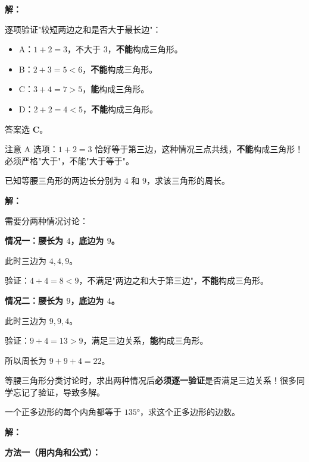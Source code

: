 \documentclass[12pt, a4paper]{ctexart}
\begin{document}
\textbf{解：}

逐项验证"较短两边之和是否大于最长边"：

\begin{itemize}[nosep]
  \item A：$1 + 2 = 3$，不大于 $3$，\textbf{不能}构成三角形。
  \item B：$2 + 3 = 5 < 6$，\textbf{不能}构成三角形。
  \item C：$3 + 4 = 7 > 5$，\textbf{能}构成三角形。
  \item D：$2 + 2 = 4 < 5$，\textbf{不能}构成三角形。
\end{itemize}

答案选 \textbf{C}。

\begin{warnbox}[易错提醒]
注意 A 选项：$1 + 2 = 3$ 恰好等于第三边，这种情况三点共线，\textbf{不能}构成三角形！必须严格"大于"，不能"大于等于"。
\end{warnbox}

\begin{examplebox}
已知等腰三角形的两边长分别为 $4$ 和 $9$，求该三角形的周长。
\end{examplebox}

\textbf{解：}

需要分两种情况讨论：

\textbf{情况一：腰长为 $4$，底边为 $9$。}

此时三边为 $4, 4, 9$。

验证：$4 + 4 = 8 < 9$，不满足"两边之和大于第三边"，\textbf{不能}构成三角形。

\textbf{情况二：腰长为 $9$，底边为 $4$。}

此时三边为 $9, 9, 4$。

验证：$9 + 4 = 13 > 9$，满足三边关系，\textbf{能}构成三角形。

所以周长为 $9 + 9 + 4 = 22$。

\begin{tipbox}[方法总结]
等腰三角形分类讨论时，求出两种情况后\textbf{必须逐一验证}是否满足三边关系！很多同学忘记了验证，导致多解。
\end{tipbox}

\begin{examplebox}
一个正多边形的每个内角都等于 $135°$，求这个正多边形的边数。
\end{examplebox}

\textbf{解：}

\textbf{方法一（用内角和公式）：}
\end{document}
